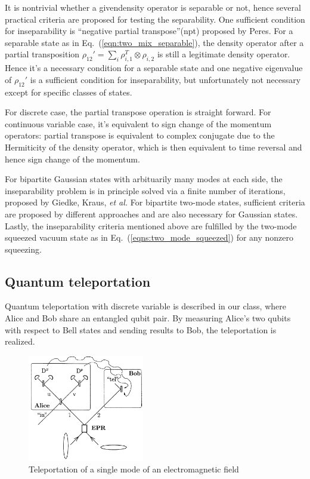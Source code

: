 \documentclass[%
 reprint,
groupedaddress,
showpacs,
 amsmath,amssymb,
 aps,
prb,
]{revtex4-1}
\begin{document}
		It is nontrivial whether a givendensity operator is separable or not, hence several practical criteria are proposed for testing the separability. One sufficient condition for inseparability is ``negative partial transpose''(npt) proposed by Peres.\cite{PhysRevLett.77.1413} For a separable state as in Eq.~(\ref{eqn:two_mix_separable}), the density operator after a partial transposition $\rho_{12}' = \sum_i \rho_{i,1}^T \otimes \rho_{i,2} $ is still a legitimate density operator. Hence it's a necessary condition for a separable state and one negative eigenvalue of $ \rho_{12}' $ is a sufficient condition for inseparability, but unfortunately not necessary except for specific classes of states.

		For discrete case, the partial transpose operation is straight forward. For continuous variable case, it's equivalent to sign change of the momentum operators: partial transpose is equivalent to complex conjugate due to the Hermiticity of the density operator, which is then equivalent to time reversal and hence sign change of the momentum.

		For bipartite Gaussian states with arbituarily many modes at each side, the inseparability problem is in principle solved via a finite number of iterations, proposed by Giedke, Kraus, \textit{et al.}\cite{PhysRevLett.87.167904} For bipartite two-mode states, sufficient criteria are proposed by different approaches\cite{PhysRevLett.84.2722,PhysRevLett.84.2726} and are also necessary for Gaussian states. Lastly, the inseparability criteria mentioned above are fulfilled	by the two-mode squeezed vacuum state as in Eq.~(\ref{eqns:two_mode_squeezed}) for any nonzero squeezing.
	

	\subsection{Quantum teleportation} %
	\label{sub:quantum_teleportation}

		Quantum teleportation with discrete variable is described in our class, where Alice and Bob share an entangled qubit pair. By measuring Alice's two qubits with respect to Bell states and sending results to Bob, the teleportation is realized.

		
		\begin{figure}[!h]
			\centering
			\includegraphics[width=2in]{fig1_teleport.png}
			\caption{Teleportation of a single mode of an electromagnetic field}
			\label{pic:teleport}
		\end{figure}
\end{document}

